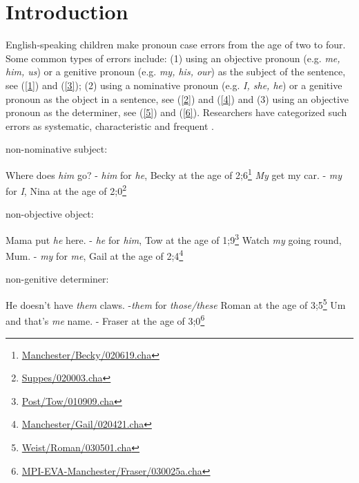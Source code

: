 \section{Introduction}
English-speaking children make pronoun case errors from the age of two to four. Some common types of errors include: (1) using an objective pronoun (e.g. \textit{me, him, us}) or a genitive pronoun (e.g. \textit{my, his, our}) as the subject of the sentence, see (\ref{1}) and (\ref{3}); (2) using a nominative pronoun (e.g. \textit{I, she, he}) or a genitive pronoun as the object in a sentence, see (\ref{2}) and (\ref{4}) and (3) using an objective pronoun as the determiner, see (\ref{5}) and (\ref{6}). Researchers have categorized such errors as systematic, characteristic and frequent \citep[e.g.][]{huxley1970development, budwig1989linguistic, pelham2011input,fitzgerald2017case}.

\begin{exe}
\ex \label{01} non-nominative subject:
\begin{xlist}
\ex \label{1} {Where does \textit{him} go? - \textit{him} for \textit{he}, Becky at the age of 2;6\footnote{\href{https://childes.talkbank.org/browser/index.php?url=Eng-UK/Manchester/Becky/020619.cha}{Manchester/Becky/020619.cha}
}}
\ex \label{3} {\textit{My} get my car. - \textit{my} for \textit{I}, Nina at the age of 2;0\footnote{\href{https://childes.talkbank.org/browser/index.php?url=Eng-NA/Suppes/020003.cha}{Suppes/020003.cha}}}
\end{xlist}
\ex non-objective object:
\begin{xlist}
\ex \label{2} {Mama put \textit{he} here. - \textit{he} for \textit{him}, Tow at the age of 1;9\footnote{\href{https://childes.talkbank.org/browser/index.php?url=Eng-NA/Post/Tow/010909.cha}{Post/Tow/010909.cha}}}
\ex \label{4} {Watch \textit{my} going round, Mum. - \textit{my} for \textit{me}, Gail at the age of 2;4\footnote{\href{https://childes.talkbank.org/browser/index.php?url=Eng-UK/Manchester/Gail/020421.cha}{Manchester/Gail/020421.cha}}}
\end{xlist}
\ex non-genitive determiner:
\begin{xlist}
\ex \label{5} He doesn't have \textit{them} claws. -\textit{them} for \textit{those/these} Roman at the age of 3;5\footnote{\href{https://childes.talkbank.org/browser/index.php?url=Eng-NA/Weist/Roman/030501.cha}{Weist/Roman/030501.cha}}
\ex \label{6} Um and that's \textit{me} name. - Fraser at the age of 3;0\footnote{\href{https://childes.talkbank.org/browser/index.php?url=Eng-UK/MPI-EVA-Manchester/Fraser/030025a.cha}{MPI-EVA-Manchester/Fraser/030025a.cha}}
\end{xlist}
\end{exe}

